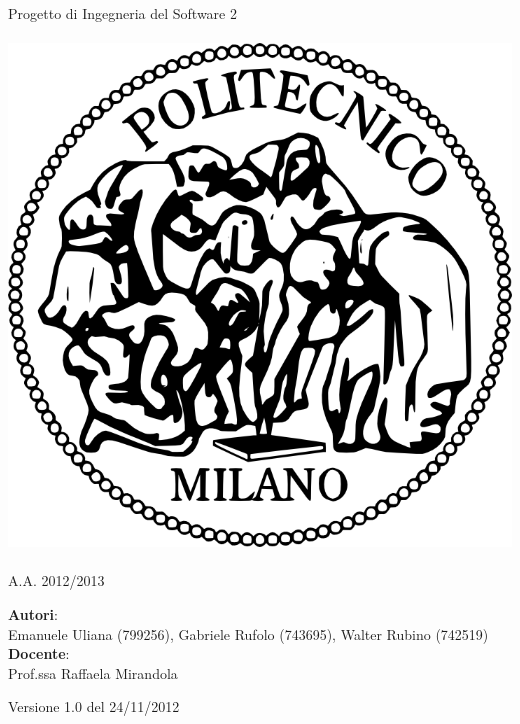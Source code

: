 \documentclass[a4paper,12pt]{article}
\begin{document}
\vspace*{\fill}
\begin{center}
{\fontsize{28}{10} \selectfont Progetto di Ingegneria del Software 2 \\[2\baselineskip]} {\fontsize{42}{10} \selectfont {\bfseries SWIMv2}} \\[4\baselineskip]
\includegraphics[scale=0.4]{polimi} \\[4\baselineskip]
{\fontsize{28}{10} \selectfont {\bfseries Requirements Analysis Specification Document} \\[2\baselineskip] A.A. 2012/2013}
\end{center}
\begin{flushleft}
{\fontsize{18}{10}
{\bfseries Autori}: \\ Emanuele Uliana (799256), Gabriele Rufolo (743695), Walter Rubino (742519) \\[1\baselineskip]
{\bfseries Docente}: \\ Prof.ssa Raffaela Mirandola
}
\end{flushleft}
\vspace*{\fill}
\begin{center}
Versione 1.0 del 24/11/2012 \\
\end{center}

\clearpage
\end{document}
